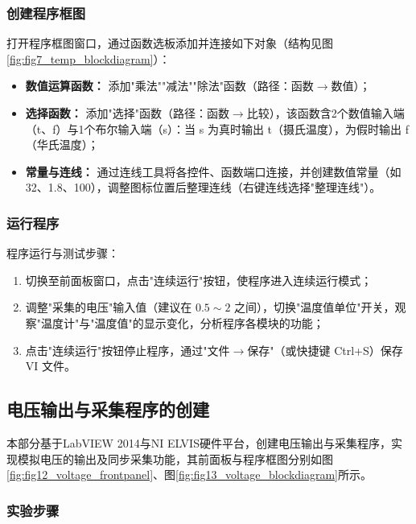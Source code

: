 \documentclass[11pt]{article}
\begin{document}
\subsubsection{创建程序框图}
打开程序框图窗口，通过函数选板添加并连接如下对象（结构见图\ref{fig:fig7_temp_blockdiagram}）：
\begin{itemize}
    \item \textbf{数值运算函数：} 添加"乘法""减法""除法"函数（路径：函数$\rightarrow$数值）；
    \item \textbf{选择函数：} 添加"选择"函数（路径：函数$\rightarrow$比较），该函数含2个数值输入端（t、f）与1个布尔输入端（s）：当 s 为真时输出 t（摄氏温度），为假时输出 f（华氏温度）；
    \item \textbf{常量与连线：} 通过连线工具将各控件、函数端口连接，并创建数值常量（如 32、1.8、100），调整图标位置后整理连线（右键连线选择"整理连线"）。
\end{itemize}


\subsubsection{运行程序}
程序运行与测试步骤：
\begin{enumerate}
    \item 切换至前面板窗口，点击"连续运行"按钮，使程序进入连续运行模式；
    \item 调整"采集的电压"输入值（建议在 $0.5\sim 2$ 之间），切换"温度值单位"开关，观察"温度计"与"温度值"的显示变化，分析程序各模块的功能；
    \item 点击"连续运行"按钮停止程序，通过"文件$\rightarrow$保存"（或快捷键 Ctrl+S）保存 VI 文件。
\end{enumerate}

\subsection{电压输出与采集程序的创建}
本部分基于LabVIEW 2014与NI ELVIS硬件平台，创建电压输出与采集程序，实现模拟电压的输出及同步采集功能，其前面板与程序框图分别如图\ref{fig:fig12_voltage_frontpanel}、图\ref{fig:fig13_voltage_blockdiagram}所示。

\subsubsection{实验步骤}
\end{document}
